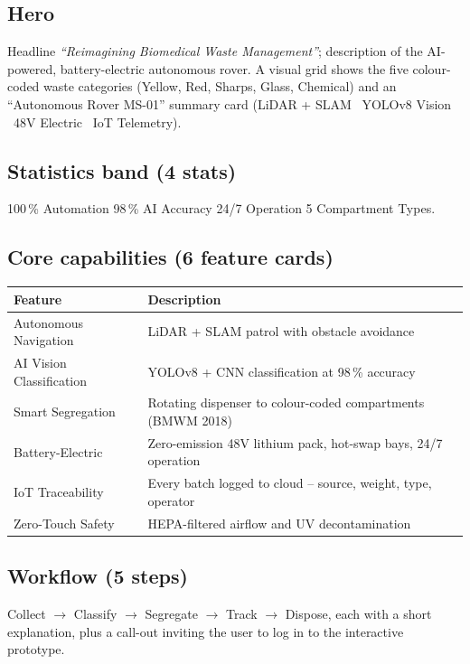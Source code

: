 \documentclass[11pt, a4paper]{article}
\begin{document}
\subsection{Hero}
Headline \emph{``Reimagining Biomedical Waste Management''}; description of the
AI-powered, battery-electric autonomous rover. A visual grid shows the five
colour-coded waste categories (Yellow, Red, Sharps, Glass, Chemical) and an
``Autonomous Rover MS-01'' summary card (LiDAR + SLAM \textperiodcentered\
YOLOv8 Vision \textperiodcentered\ 48V Electric \textperiodcentered\ IoT
Telemetry).

\subsection{Statistics band (4 stats)}
100\,\% Automation \textperiodcentered{} 98\,\% AI Accuracy \textperiodcentered{}
24/7 Operation \textperiodcentered{} 5 Compartment Types.

\subsection{Core capabilities (6 feature cards)}
\begin{tabularx}{\textwidth}{lX}
  \toprule
  \textbf{Feature} & \textbf{Description}\\
  \midrule
  Autonomous Navigation & LiDAR + SLAM patrol with obstacle avoidance\\
  AI Vision Classification & YOLOv8 + CNN classification at 98\,\% accuracy\\
  Smart Segregation & Rotating dispenser to colour-coded compartments (BMWM 2018)\\
  Battery-Electric & Zero-emission 48V lithium pack, hot-swap bays, 24/7 operation\\
  IoT Traceability & Every batch logged to cloud -- source, weight, type, operator\\
  Zero-Touch Safety & HEPA-filtered airflow and UV decontamination\\
  \bottomrule
\end{tabularx}

\subsection{Workflow (5 steps)}
Collect $\rightarrow$ Classify $\rightarrow$ Segregate $\rightarrow$ Track
$\rightarrow$ Dispose, each with a short explanation, plus a call-out inviting
the user to log in to the interactive prototype.
\end{document}
